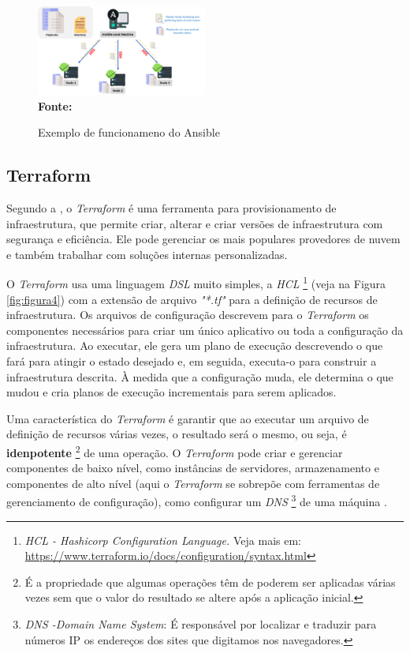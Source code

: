 \begin{figure}[ht]
	\centering	
	\caption[\hspace{0.1cm}Exemplo de funcionameno do Ansible]{Exemplo de funcionameno do Ansible}
	\vspace{-0.4cm}
	\includegraphics[width=0.5\textwidth]{figuras/ansible-working.png}
	 \vspace{-0.2cm}
	\\\textbf{\footnotesize Fonte: \cite{intellipaat}}
	\label{fig:figura6}
\end{figure}
\vspace{-0.5cm}

\subsection{Terraform} \label{terraform} 

 Segundo a , o \textit{Terraform} é uma ferramenta para provisionamento de infraestrutura, que permite criar, alterar e criar versões de infraestrutura com segurança e eficiência. Ele pode gerenciar os mais populares provedores de nuvem e também trabalhar com soluções internas personalizadas.

O \textit{Terraform} usa uma linguagem \textit{DSL} muito simples, a \textit{HCL} \footnote{\textit{HCL - Hashicorp Configuration Language.} Veja mais em: \href{https://www.terraform.io/docs/configuration/syntax.html}{https://www.terraform.io/docs/configuration/syntax.html} } (veja na Figura \ref{fig:figura4}) com a extensão de arquivo \textit{"*.tf"} para a definição de recursos de infraestrutura. Os arquivos de configuração descrevem para o \textit{Terraform} os componentes necessários para criar um único aplicativo ou toda a configuração da infraestrutura. Ao executar, ele gera um plano de execução descrevendo o que fará para atingir o estado desejado e, em seguida, executa-o para construir a infraestrutura descrita. 
À medida que a configuração muda, ele determina o que mudou e cria planos de execução incrementais para serem aplicados.

Uma característica do \textit{Terraform} é garantir que ao executar um arquivo de definição de recursos várias vezes, o resultado será o mesmo, ou seja, é \textbf{idenpotente} \footnote{É a propriedade que algumas operações têm de poderem ser aplicadas várias vezes sem que o valor do resultado se altere após a aplicação inicial.} de uma operação. O \textit{Terraform} pode criar e gerenciar componentes de baixo nível, como instâncias de servidores, armazenamento e componentes de alto nível (aqui o \textit{Terraform} se sobrepõe com ferramentas de gerenciamento de configuração), como configurar um \textit{DNS} \footnote{\textit{DNS -Domain Name System}: É responsável por localizar e traduzir para números IP os endereços dos sites que digitamos nos navegadores.} de uma máquina \cite{brikman2017terraform}.

